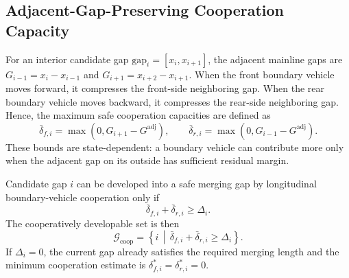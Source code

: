 \documentclass[conference]{IEEEtran}
\begin{document}
\subsection{Adjacent-Gap-Preserving Cooperation Capacity}
For an interior candidate gap \(\mathrm{gap}_i=[x_i,x_{i+1}]\), the adjacent
mainline gaps are \(G_{i-1}=x_i-x_{i-1}\) and
\(G_{i+1}=x_{i+2}-x_{i+1}\). When the front boundary vehicle moves forward, it
compresses the front-side neighboring gap. When the rear boundary vehicle moves
backward, it compresses the rear-side neighboring gap. Hence, the maximum safe
cooperation capacities are defined as
\begin{equation}
    \bar{\delta}_{f,i}=\max(0,G_{i+1}-G^{\mathrm{adj}}),
    \qquad
    \bar{\delta}_{r,i}=\max(0,G_{i-1}-G^{\mathrm{adj}}).
    \label{eq:capacity}
\end{equation}
These bounds are state-dependent: a boundary vehicle can contribute more only
when the adjacent gap on its outside has sufficient residual margin.

Candidate gap \(i\) can be developed into a safe merging gap by longitudinal
boundary-vehicle cooperation only if
\begin{equation}
    \bar{\delta}_{f,i}+\bar{\delta}_{r,i}\geq \Delta_i.
    \label{eq:coop_feasibility}
\end{equation}
The cooperatively developable set is then
\begin{equation}
    \mathcal{G}_{\mathrm{coop}}
    =
    \left\{
    i\,\middle|\,
    \bar{\delta}_{f,i}+\bar{\delta}_{r,i}\geq \Delta_i
    \right\}.
    \label{eq:coop_set}
\end{equation}
If \(\Delta_i=0\), the current gap already satisfies the required merging
length and the minimum cooperation estimate is
\(\delta_{f,i}^*=\delta_{r,i}^*=0\).
\end{document}
